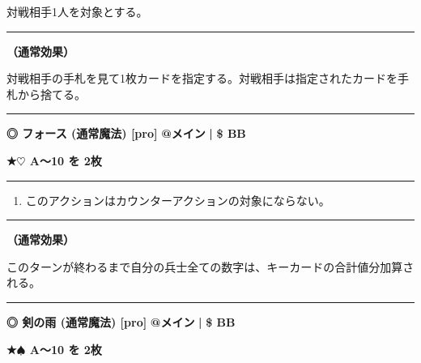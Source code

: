 \documentclass[twocolumn,a5paper,papersize,10pt]{jarticle}
\begin{document}
対戦相手1人を対象とする。
\vspace{1mm}%
\hrule height 0.1mm depth 0mm width 66.5mm %
\vspace{1mm}%

{\bf（通常効果）}

対戦相手の手札を見て1枚カードを指定する。対戦相手は指定されたカードを手札から捨てる。
\vspace{2mm} %
\hrule height 0.5mm depth 0mm width 66.5mm %
\vspace{1mm} %
{\small\bf ◎ フォース {\scriptsize (通常魔法) [pro]}} %
\hfill 
{\footnotesize\bf @メイン }
  {\footnotesize\bf | } {\footnotesize\bf \$ BB}

{\footnotesize\bf ★{\normalsize $\heartsuit$} A〜10 を 2枚}

\vspace{1mm}%
\hrule height 0.1mm depth 0mm width 66.5mm %
\vspace{1mm}%


\vspace{-1zh}%
\begin{enumerate}
\renewcommand{\labelenumi}{※}
\setlength{\leftskip}{-0.3cm}
\setlength{\itemsep}{0pt} %
\setlength{\parskip}{0pt} %

\item このアクションはカウンターアクションの対象にならない。

\vspace{-3mm}%
\end{enumerate}
\vspace{1mm}%
\hrule height 0.1mm depth 0mm width 66.5mm %
\vspace{1mm}%

{\bf（通常効果）}

このターンが終わるまで自分の兵士全ての数字は、キーカードの合計値分加算される。
\vspace{2mm} %
\hrule height 0.5mm depth 0mm width 66.5mm %
\vspace{1mm} %
{\small\bf ◎ 剣の雨 {\scriptsize (通常魔法) [pro]}} %
\hfill 
{\footnotesize\bf @メイン }
  {\footnotesize\bf | } {\footnotesize\bf \$ BB}

{\footnotesize\bf ★{\normalsize $\spadesuit$} A〜10 を 2枚}
\end{document}
